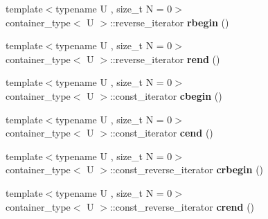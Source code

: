 \begin{DoxyCompactItemize}
\item 
\hypertarget{classheterogeneous_1_1heterovector_3_01_t_00_01_types_8_8_8_4_ae20fd2111618e2312c1402cc3da6e178}{}{\footnotesize template$<$typename U , size\+\_\+t N = 0$>$ }\\container\+\_\+type$<$ U $>$\+::reverse\+\_\+iterator {\bfseries rbegin} ()\label{classheterogeneous_1_1heterovector_3_01_t_00_01_types_8_8_8_4_ae20fd2111618e2312c1402cc3da6e178}

\item 
\hypertarget{classheterogeneous_1_1heterovector_3_01_t_00_01_types_8_8_8_4_a5136941ab39ccc29d3e67682d1874222}{}{\footnotesize template$<$typename U , size\+\_\+t N = 0$>$ }\\container\+\_\+type$<$ U $>$\+::reverse\+\_\+iterator {\bfseries rend} ()\label{classheterogeneous_1_1heterovector_3_01_t_00_01_types_8_8_8_4_a5136941ab39ccc29d3e67682d1874222}

\item 
\hypertarget{classheterogeneous_1_1heterovector_3_01_t_00_01_types_8_8_8_4_a8c4d3926d55392c5d74a368d138ff002}{}{\footnotesize template$<$typename U , size\+\_\+t N = 0$>$ }\\container\+\_\+type$<$ U $>$\+::const\+\_\+iterator {\bfseries cbegin} ()\label{classheterogeneous_1_1heterovector_3_01_t_00_01_types_8_8_8_4_a8c4d3926d55392c5d74a368d138ff002}

\item 
\hypertarget{classheterogeneous_1_1heterovector_3_01_t_00_01_types_8_8_8_4_a5854b5deabe059db780d83e9fabb99a8}{}{\footnotesize template$<$typename U , size\+\_\+t N = 0$>$ }\\container\+\_\+type$<$ U $>$\+::const\+\_\+iterator {\bfseries cend} ()\label{classheterogeneous_1_1heterovector_3_01_t_00_01_types_8_8_8_4_a5854b5deabe059db780d83e9fabb99a8}

\item 
\hypertarget{classheterogeneous_1_1heterovector_3_01_t_00_01_types_8_8_8_4_afbd197cd7ac9749c17dcfb713c5a7282}{}{\footnotesize template$<$typename U , size\+\_\+t N = 0$>$ }\\container\+\_\+type$<$ U $>$\+::const\+\_\+reverse\+\_\+iterator {\bfseries crbegin} ()\label{classheterogeneous_1_1heterovector_3_01_t_00_01_types_8_8_8_4_afbd197cd7ac9749c17dcfb713c5a7282}

\item 
\hypertarget{classheterogeneous_1_1heterovector_3_01_t_00_01_types_8_8_8_4_a604551f70068da52e379c1a5f6f5d07d}{}{\footnotesize template$<$typename U , size\+\_\+t N = 0$>$ }\\container\+\_\+type$<$ U $>$\+::const\+\_\+reverse\+\_\+iterator {\bfseries crend} ()\label{classheterogeneous_1_1heterovector_3_01_t_00_01_types_8_8_8_4_a604551f70068da52e379c1a5f6f5d07d}


\end{DoxyCompactItemize}
